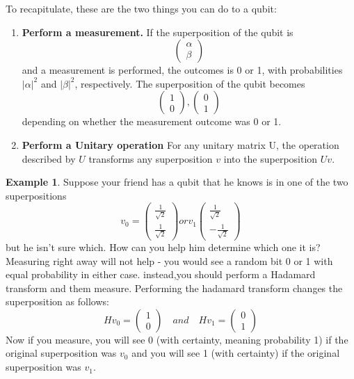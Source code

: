 \documentclass[12pt, oneside]{book}
\theoremstyle{definition}
\theoremstyle{definition}
\newtheorem{example}{Example}[section]
\theoremstyle{remark}
\begin{document}
To recapitulate, these are the two things you can do to a qubit:
\begin{enumerate}
    \item \textbf{Perform a measurement.} If the superposition of the qubit is
    \[
    \begin{pmatrix} \alpha \\ \beta \end{pmatrix}
    \]
    and a measurement is performed, the outcomes is 0 or 1, with probabilities $|\alpha|^2$ and $|\beta|^2$, respectively. The superposition of the qubit becomes
    \[
    \begin{pmatrix} 1 \\ 0 \end{pmatrix}, \begin{pmatrix} 0 \\1 \end{pmatrix}
    \]
    depending on whether the measurement outcome was 0 or 1.
    \item \textbf{Perform a Unitary operation} For any unitary matrix U, the operation described by $U$ transforms any superposition $v$ into the superposition $Uv$.
\end{enumerate}

\begin{example}
    Suppose your friend has a qubit that he knows is in one of the two superpositions
    \[
    v_0=\begin{pmatrix} \frac{1}{\sqrt{2}} \\ \frac{1}{\sqrt{2}} \end{pmatrix} or v_1\begin{pmatrix} \frac{1}{\sqrt{2}} \\ -\frac{1}{\sqrt{2}} \end{pmatrix}
    \]
    but he isn't sure which. How can you help him determine which one it is?
    Measuring right away will not help - you would see a random bit 0 or 1 with equal probability in either case. instead,you should perform a Hadamard transform and them measure. Performing the hadamard transform changes the superposition as follows:
    \[
    Hv_0=\begin{pmatrix} 1 \\ 0\end{pmatrix} \quad and \quad Hv_1 =\begin{pmatrix} 0 \\1 \end{pmatrix}
    \]
    Now if you measure, you will see 0 (with certainty, meaning probability 1) if the original superposition was $v_0$ and you will see 1 (with certainty) if the original superposition was $v_1$.
\end{example}
\end{document}
